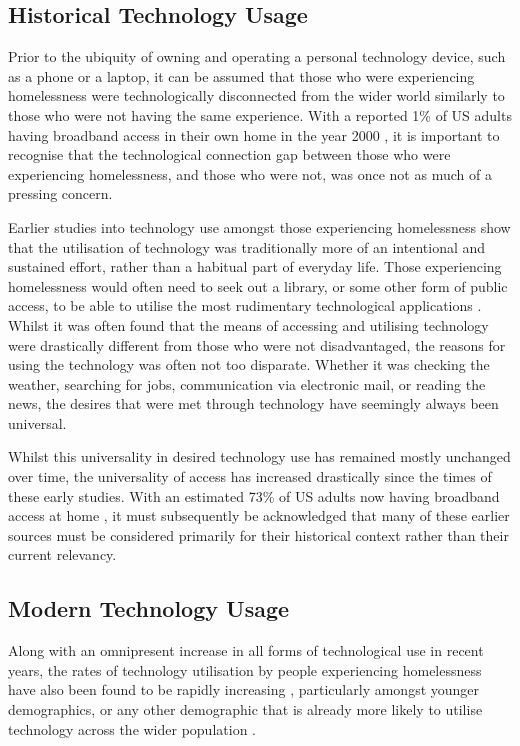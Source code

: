 \subsection{Historical Technology Usage}

Prior to the ubiquity of owning and operating a personal technology device, such as a phone or a laptop, it can be assumed that those who were experiencing homelessness were technologically disconnected from the wider world similarly to those who were not having the same experience. With a reported 1\% of US adults having broadband access in their own home in the year 2000 \cite{smith_2017}, it is important to recognise that the technological connection gap between those who were experiencing homelessness, and those who were not, was once not as much of a pressing concern.

Earlier studies into technology use amongst those experiencing homelessness show that the utilisation of technology was traditionally more of an intentional and sustained effort, rather than a habitual part of everyday life. Those experiencing homelessness would often need to seek out a library, or some other form of public access, to be able to utilise the most rudimentary technological applications \cite{eyrich2011sheltered} \cite{le2008designs}. Whilst it was often found that the means of accessing and utilising technology were drastically different from those who were not disadvantaged, the reasons for using the technology was often not too disparate. Whether it was checking the weather, searching for jobs, communication via electronic mail, or reading the news, the desires that were met through technology have seemingly always been universal.

Whilst this universality in desired technology use has remained mostly unchanged over time, the universality of access has increased drastically since the times of these early studies. With an estimated 73\% of US adults now having broadband access at home \cite{smith_2017}, it must subsequently be acknowledged that many of these earlier sources must be considered primarily for their historical context rather than their current relevancy.

\subsection{Modern Technology Usage}

Along with an omnipresent increase in all forms of technological use in recent years, the rates of technology utilisation by people experiencing homelessness have also been found to be rapidly increasing \cite{rhoades2017no} \cite{eyrich2011sheltered} \cite{pollio2013technology}, particularly amongst younger demographics, or any other demographic that is already more likely to utilise technology across the wider population \cite{woelfer2010homeless}.

